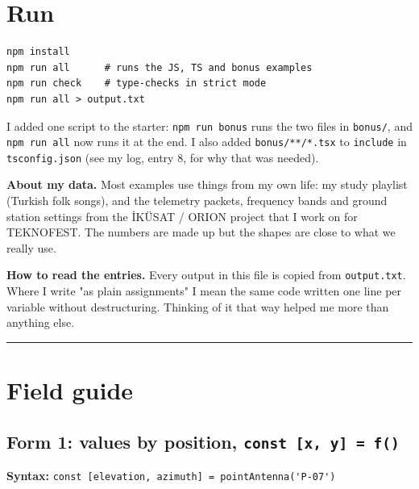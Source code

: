 \hypertarget{run}{%
\section{Run}\label{run}}

\begin{lstlisting}
npm install
npm run all      # runs the JS, TS and bonus examples
npm run check    # type-checks in strict mode
npm run all > output.txt
\end{lstlisting}

I added one script to the starter: \passthrough{\lstinline!npm run bonus!} runs the two files in \passthrough{\lstinline!bonus/!}, and \passthrough{\lstinline!npm run all!} now runs it at the end. I also added \passthrough{\lstinline!bonus/**/*.tsx!} to \passthrough{\lstinline!include!} in \passthrough{\lstinline!tsconfig.json!} (see my log, entry 8, for why that was needed).

\textbf{About my data.} Most examples use things from my own life: my study playlist (Turkish folk songs), and the telemetry packets, frequency bands and ground station settings from the İKÜSAT / ORION project that I work on for TEKNOFEST. The numbers are made up but the shapes are close to what we really use.

\textbf{How to read the entries.} Every output in this file is copied from \passthrough{\lstinline!output.txt!}. Where I write "as plain assignments" I mean the same code written one line per variable without destructuring. Thinking of it that way helped me more than anything else.

\begin{center}\rule{0.5\linewidth}{0.5pt}\end{center}

\hypertarget{field-guide}{%
\section{Field guide}\label{field-guide}}

\hypertarget{form-1-values-by-position-const-x-y--f}{%
\subsection{\texorpdfstring{Form 1: values by position, \texttt{const\ {[}x,\ y{]}\ =\ f()}}{Form 1: values by position, const {[}x, y{]} = f()}}\label{form-1-values-by-position-const-x-y--f}}

\textbf{Syntax:} \passthrough{\lstinline!const [elevation, azimuth] = pointAntenna('P-07')!}

